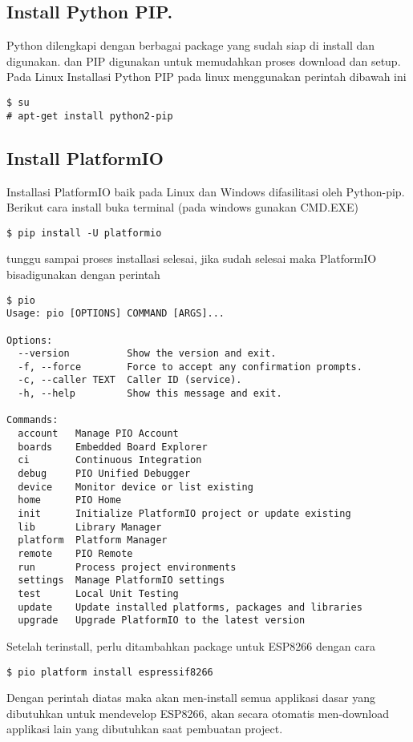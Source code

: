 \subsection{Install Python PIP.}
Python dilengkapi dengan berbagai package yang sudah siap di install dan digunakan. dan PIP digunakan untuk memudahkan proses download dan setup.\newline
Pada Linux Installasi Python PIP pada linux menggunakan perintah dibawah ini
\begin{lstlisting}[style=bash]
$ su
# apt-get install python2-pip
\end{lstlisting}

\subsection{Install PlatformIO}
Installasi PlatformIO baik pada Linux dan Windows difasilitasi oleh Python-pip. Berikut cara install \pio{} buka terminal (pada windows gunakan CMD.EXE)
\begin{lstlisting}[style=bash]
$ pip install -U platformio
\end{lstlisting}
tunggu sampai proses installasi selesai, jika sudah selesai maka PlatformIO bisadigunakan dengan perintah 
\begin{lstlisting}[style=bash]
$ pio
Usage: pio [OPTIONS] COMMAND [ARGS]...

Options:
  --version          Show the version and exit.
  -f, --force        Force to accept any confirmation prompts.
  -c, --caller TEXT  Caller ID (service).
  -h, --help         Show this message and exit.

Commands:
  account   Manage PIO Account
  boards    Embedded Board Explorer
  ci        Continuous Integration
  debug     PIO Unified Debugger
  device    Monitor device or list existing
  home      PIO Home
  init      Initialize PlatformIO project or update existing
  lib       Library Manager
  platform  Platform Manager
  remote    PIO Remote
  run       Process project environments
  settings  Manage PlatformIO settings
  test      Local Unit Testing
  update    Update installed platforms, packages and libraries
  upgrade   Upgrade PlatformIO to the latest version
\end{lstlisting}
Setelah \pio{} terinstall, perlu ditambahkan package untuk ESP8266 dengan cara

\begin{lstlisting}[style=bash]
$ pio platform install espressif8266
\end{lstlisting}
Dengan perintah diatas maka \pio{} akan men-install semua applikasi dasar yang dibutuhkan untuk mendevelop ESP8266, \pio{} akan secara otomatis men-download applikasi lain yang dibutuhkan saat pembuatan project.

